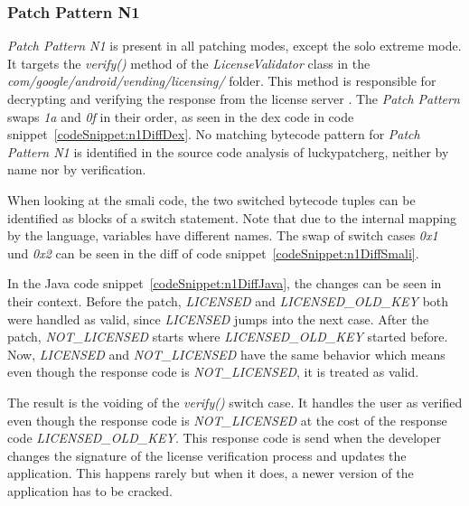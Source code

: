 \subsubsection{Patch Pattern N1}
\textit{Patch Pattern N1} is present in all patching modes, except the solo extreme mode.
It targets the \textit{verify()} method of the \textit{LicenseValidator} class in the \textit{com/google/android/vending/licensing/} folder.
This method is responsible for decrypting and verifying the response from the license server \cite{developersLicensingReference}.
\newline
The \textit{Patch Pattern} swaps \textit{1a} and \textit{0f} in their order, as seen in the dex code in code snippet~\ref{codeSnippet:n1DiffDex}.
\newline
No matching bytecode pattern for \textit{Patch Pattern N1} is identified in the source code analysis of \gls{luckypatcherg}, neither by name nor by verification.
\newline

When looking at the smali code, the two switched bytecode tuples can be identified as blocks of a switch statement.
Note that due to the internal mapping by the language, variables have different names.
The swap of switch cases \textit{0x1} und \textit{0x2} can be seen in the diff of code snippet~\ref{codeSnippet:n1DiffSmali}.
\newline

In the Java code snippet~\ref{codeSnippet:n1DiffJava}, the changes can be seen in their context.
Before the patch, \textit{LICENSED} and \textit{LICENSED\_OLD\_KEY} both were handled as valid, since \textit{LICENSED} jumps into the next case.
After the patch, \textit{NOT\_LICENSED} starts where \textit{LICENSED\_OLD\_KEY} started before.
Now, \textit{LICENSED} and \textit{NOT\_LICENSED} have the same behavior which means even though the response code is \textit{NOT\_LICENSED}, it is treated as valid.
\newline

The result is the voiding of the \textit{verify()} switch case.
It handles the user as verified even though the response code is \textit{NOT\_LICENSED} at the cost of the response code \textit{LICENSED\_OLD\_KEY}.
This response code is send when the developer changes the signature of the license verification process and updates the application.
This happens rarely but when it does, a newer version of the application has to be cracked.


